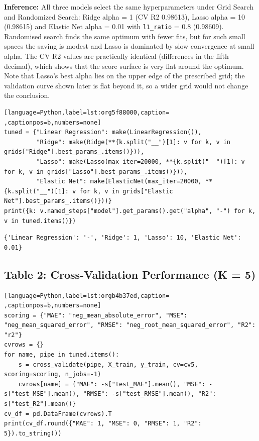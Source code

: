 \documentclass[11pt]{article}
\begin{document}
\textbf{Inference:} All three models select the same hyperparameters under Grid Search and Randomized Search:
Ridge alpha = 1 (CV R2 0.98613), Lasso alpha = 10 (0.98615) and Elastic Net alpha = 0.01
with \texttt{l1\_ratio} = 0.8 (0.98609). Randomised search finds the same optimum with fewer fits,
but for such small spaces the saving is modest and Lasso is dominated by slow convergence at
small alpha. The CV R2 values are practically identical (differences in the fifth decimal),
which shows that the score surface is very flat around the optimum. Note that Lasso's best
alpha lies on the upper edge of the prescribed grid; the validation curve shown later is
flat beyond it, so a wider grid would not change the conclusion.
\begin{lstlisting}[language=Python,label=lst:org5f88000,caption= ,captionpos=b,numbers=none]
tuned = {"Linear Regression": make(LinearRegression()),
         "Ridge": make(Ridge(**{k.split("__")[1]: v for k, v in grids["Ridge"].best_params_.items()})),
         "Lasso": make(Lasso(max_iter=20000, **{k.split("__")[1]: v for k, v in grids["Lasso"].best_params_.items()})),
         "Elastic Net": make(ElasticNet(max_iter=20000, **{k.split("__")[1]: v for k, v in grids["Elastic Net"].best_params_.items()}))}
print({k: v.named_steps["model"].get_params().get("alpha", "-") for k, v in tuned.items()})
\end{lstlisting}

\begin{verbatim}
{'Linear Regression': '-', 'Ridge': 1, 'Lasso': 10, 'Elastic Net': 0.01}
\end{verbatim}

\subsection*{Table 2: Cross-Validation Performance (K = 5)}
\label{sec:org5dca189}

\begin{lstlisting}[language=Python,label=lst:orgb4b37ed,caption= ,captionpos=b,numbers=none]
scoring = {"MAE": "neg_mean_absolute_error", "MSE": "neg_mean_squared_error", "RMSE": "neg_root_mean_squared_error", "R2": "r2"}
cvrows = {}
for name, pipe in tuned.items():
    s = cross_validate(pipe, X_train, y_train, cv=cv5, scoring=scoring, n_jobs=-1)
    cvrows[name] = {"MAE": -s["test_MAE"].mean(), "MSE": -s["test_MSE"].mean(), "RMSE": -s["test_RMSE"].mean(), "R2": s["test_R2"].mean()}
cv_df = pd.DataFrame(cvrows).T
print(cv_df.round({"MAE": 1, "MSE": 0, "RMSE": 1, "R2": 5}).to_string())
\end{lstlisting}
\end{document}

